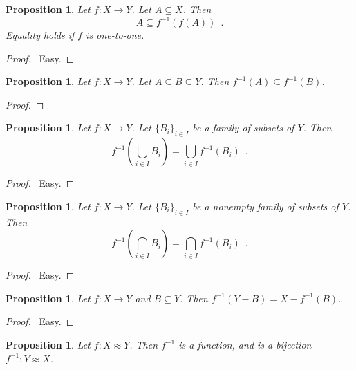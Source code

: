 \documentclass{report}
\let\qed\relax
\newtheorem{prop}[ax]{Proposition}
\theoremstyle{definition}
\begin{document}
\begin{prop}
Let $f : X \rightarrow Y$. Let $A \subseteq X$. Then
\[ A \subseteq f^{-1}(f(A)) \enspace . \]
Equality holds if $f$ is one-to-one.
\end{prop}

\begin{proof}
\pf\ Easy. \qed
\end{proof}

\begin{prop}
Let $f : X \rightarrow Y$. Let $A \subseteq B \subseteq Y$. Then $f^{-1}(A) \subseteq f^{-1}(B)$.
\end{prop}

\begin{proof}
\pf
{}
\qed
\end{proof}

\begin{prop}
Let $f : X \rightarrow Y$. Let $\{B_i\}_{i \in I}$ be a family of subsets of $Y$. Then
\[ f^{-1} \left( \bigcup_{i \in I} B_i \right) = \bigcup_{i \in I} f^{-1}(B_i) \enspace . \]
\end{prop}

\begin{proof}
\pf\ Easy. \qed
\end{proof}

\begin{prop}
Let $f : X \rightarrow Y$. Let $\{B_i\}_{i \in I}$ be a nonempty family of subsets of $Y$. Then
\[ f^{-1} \left( \bigcap_{i \in I} B_i \right) = \bigcap_{i \in I} f^{-1}(B_i) \enspace . \]
\end{prop}

\begin{proof}
\pf\ Easy. \qed
\end{proof}

\begin{prop}
Let $f : X \rightarrow Y$ and $B \subseteq Y$. Then $f^{-1}(Y - B) = X - f^{-1}(B)$.
\end{prop}

\begin{proof}
\pf\ Easy. \qed
\end{proof}

\begin{prop}
Let $f : X \approx Y$. Then $f^{-1}$ is a function, and is a bijection $f^{-1} : Y \approx X$.
\end{prop}
\end{document}
